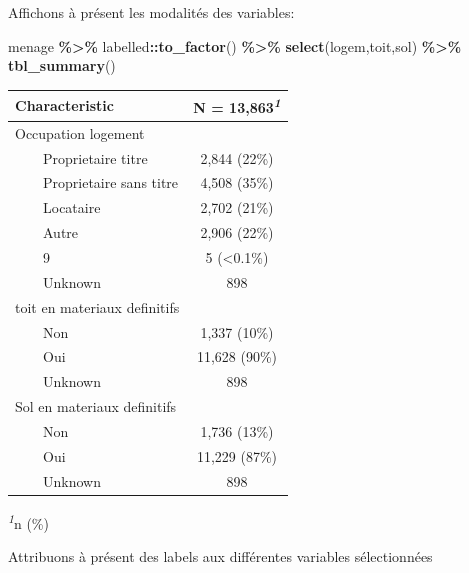 \documentclass[
]{article}
\newenvironment{Shaded}{\begin{snugshade}}{\end{snugshade}}
\newcommand{\FunctionTok}[1]{\textcolor[rgb]{0.13,0.29,0.53}{\textbf{#1}}}
\newcommand{\NormalTok}[1]{#1}
\newcommand{\SpecialCharTok}[1]{\textcolor[rgb]{0.81,0.36,0.00}{\textbf{#1}}}
\begin{document}
\newpage

Affichons à présent les modalités des variables:

\begin{Shaded}
\begin{Highlighting}[]
\NormalTok{menage }\SpecialCharTok{\%\textgreater{}\%}
\NormalTok{  labelled}\SpecialCharTok{::}\FunctionTok{to\_factor}\NormalTok{() }\SpecialCharTok{\%\textgreater{}\%}
  \FunctionTok{select}\NormalTok{(logem,toit,sol) }\SpecialCharTok{\%\textgreater{}\%}
  \FunctionTok{tbl\_summary}\NormalTok{()}
\end{Highlighting}
\end{Shaded}

\begin{table}[!t]
\fontsize{12.0pt}{14.4pt}\selectfont
\begin{tabular*}{\linewidth}{@{\extracolsep{\fill}}lc}
\toprule
\textbf{Characteristic} & \textbf{N = 13,863}\textsuperscript{\textit{1}} \\ 
\midrule\addlinespace[2.5pt]
Occupation logement &  \\ 
    Proprietaire titre & 2,844 (22\%) \\ 
    Proprietaire sans titre & 4,508 (35\%) \\ 
    Locataire & 2,702 (21\%) \\ 
    Autre & 2,906 (22\%) \\ 
    9 & 5 (<0.1\%) \\ 
    Unknown & 898 \\ 
toit en materiaux definitifs &  \\ 
    Non & 1,337 (10\%) \\ 
    Oui & 11,628 (90\%) \\ 
    Unknown & 898 \\ 
Sol en materiaux definitifs &  \\ 
    Non & 1,736 (13\%) \\ 
    Oui & 11,229 (87\%) \\ 
    Unknown & 898 \\ 
\bottomrule
\end{tabular*}
\begin{minipage}{\linewidth}
\textsuperscript{\textit{1}}n (\%)\\
\end{minipage}
\end{table}

\newpage

Attribuons à présent des labels aux différentes variables sélectionnées
\end{document}
